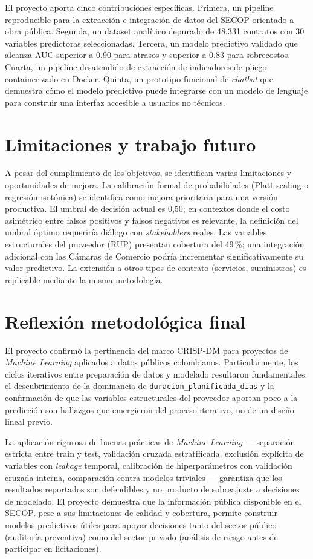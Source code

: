 \documentclass[12pt,letterpaper,oneside]{report}
\begin{document}
El proyecto aporta cinco contribuciones específicas. Primera, un pipeline
reproducible para la extracción e integración de datos del SECOP orientado a
obra pública. Segunda, un dataset analítico depurado de 48.331 contratos con
30 variables predictoras seleccionadas. Tercera, un modelo predictivo
validado que alcanza AUC superior a 0,90 para atrasos y superior a 0,83 para
sobrecostos. Cuarta, un pipeline desatendido de extracción de indicadores de
pliego containerizado en Docker. Quinta, un prototipo funcional de
\emph{chatbot} que demuestra cómo el modelo predictivo puede integrarse con
un modelo de lenguaje para construir una interfaz accesible a usuarios no
técnicos.

\section{Limitaciones y trabajo futuro}

A pesar del cumplimiento de los objetivos, se identifican varias limitaciones
y oportunidades de mejora. La calibración formal de probabilidades (Platt
scaling o regresión isotónica) se identifica como mejora prioritaria para una
versión productiva. El umbral de decisión actual es 0,50; en contextos donde
el costo asimétrico entre falsos positivos y falsos negativos es relevante,
la definición del umbral óptimo requeriría diálogo con \emph{stakeholders}
reales. Las variables estructurales del proveedor (RUP) presentan cobertura
del 49\,\%; una integración adicional con las Cámaras de Comercio podría
incrementar significativamente su valor predictivo. La extensión a otros
tipos de contrato (servicios, suministros) es replicable mediante la misma
metodología.

\section{Reflexión metodológica final}

El proyecto confirmó la pertinencia del marco CRISP-DM para proyectos de
\emph{Machine Learning} aplicados a datos públicos colombianos.
Particularmente, los ciclos iterativos entre preparación de datos y modelado
resultaron fundamentales: el descubrimiento de la dominancia de
\texttt{duracion\_planificada\_dias} y la confirmación de que las variables
estructurales del proveedor aportan poco a la predicción son hallazgos que
emergieron del proceso iterativo, no de un diseño lineal previo.

La aplicación rigurosa de buenas prácticas de \emph{Machine Learning} ---
separación estricta entre train y test, validación cruzada estratificada,
exclusión explícita de variables con \emph{leakage} temporal, calibración de
hiperparámetros con validación cruzada interna, comparación contra modelos
triviales --- garantiza que los resultados reportados son defendibles y no
producto de sobreajuste a decisiones de modelado. El proyecto demuestra que
la información pública disponible en el SECOP, pese a sus limitaciones de
calidad y cobertura, permite construir modelos predictivos útiles para
apoyar decisiones tanto del sector público (auditoría preventiva) como del
sector privado (análisis de riesgo antes de participar en licitaciones).
\end{document}
